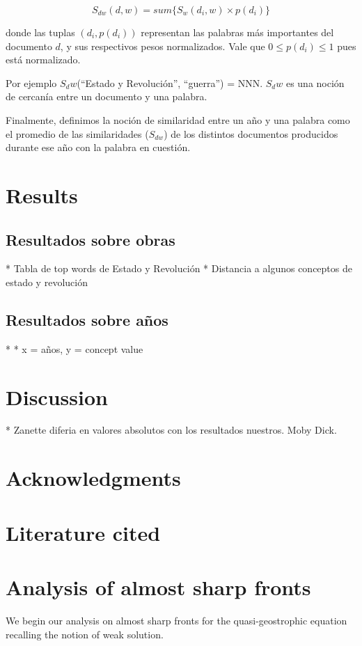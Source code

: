 \documentclass{pnastwo}
\begin{document}
\begin{article}
\begin{equation}
S_{dw}(d, w) = sum \{ S_w(d_i, w) \times p(d_i)  \} 
\end{equation}

donde las tuplas $(d_i , p(d_i))$ representan las palabras más importantes del documento $d$, y sus respectivos pesos normalizados. Vale que $0 \leq p(d_i) \leq 1$ pues está normalizado.

Por ejemplo $S_dw$(“Estado y Revolución”, “guerra”) = NNN. $S_dw$ es una noción de cercanía entre un documento y una palabra.

Finalmente, definimos la noción de similaridad entre un año y una palabra como el promedio de las similaridades ($S_{dw}$) 
de los distintos documentos producidos durante ese año con la palabra en cuestión. 

% 

\section{Results}
\subsection{Resultados sobre obras}
* Tabla de top words de Estado y Revolución
* Distancia a algunos conceptos de estado y revolución
\subsection{Resultados sobre años}
*
* x = {años}, y = {concept value}

\section{Discussion}
* Zanette diferia en valores absolutos con los resultados nuestros. Moby Dick. 

\section{Acknowledgments}
\section{Literature cited}



\section{Analysis of almost sharp fronts}
We begin our analysis on almost sharp fronts for the
quasi-geostrophic equation recalling the notion of weak solution.


\end{article}
\end{document}
